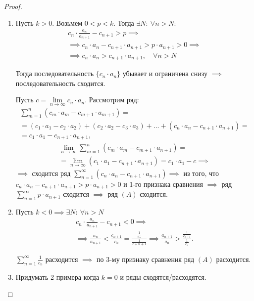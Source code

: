 \begin{proof}\leavevmode
    \begin{enumerate}
        \item Пусть $k > 0$. Возьмем $0 < p < k$. Тогда $\exists N : \ \forall n > N$:
              \begin{multline*}
                  c_n \cdot \frac{a_n}{a_{n+1}} - c_{n+1}>p \implies \\
                  \implies c_n \cdot a_n - c_{n+1} \cdot a_{n+1} > p \cdot a_{n+1} > 0 \implies \\
                  \implies c_n \cdot a_n > c_{n+1} \cdot a_{n+1}, \quad \forall n > N
              \end{multline*}

              Тогда последовательность $\{c_n\cdot a_n\}$ убывает и ограничена снизу $\implies$ последовательность сходится.

              Пусть $c=\underset{n\rightarrow\infty}{\lim}c_n\cdot a_n$. Рассмотрим ряд:
              \begin{multline*}
                  \sum_{m=1}^{n}(c_m\cdot a_m - c_{m+1}\cdot a_{m+1}) = \\
                  = (c_1 \cdot a_1 - c_2 \cdot a_2) + (c_2 \cdot a_2 - c_3 \cdot a_3) + \ldots + (c_n \cdot a_n - c_{n+1}\cdot a_{n+1}) = \\
                  = c_1 \cdot a_1 - c_{n+1} \cdot a_{n+1},
              \end{multline*}
              \begin{multline*}
                  \underset{n\rightarrow\infty}{\lim}\sum_{m=1}^{n}(c_m \cdot a_m - c_{m+1} \cdot a_{n+1}) = \\
                  = \underset{n\rightarrow\infty}{\lim}(c_1 \cdot a_1 - c_{n+1} \cdot a_{n+1}) = c_1 \cdot a_1 - c \implies
              \end{multline*}
              $\implies$ сходится ряд $\sum_{n=1}^{\infty}(c_n \cdot a_n - c_{n+1} \cdot a_{n+1}) \implies$ из того, что $c_n \cdot a_n - c_{n+1} \cdot a_{n+1} > p \cdot a_{n+1} > 0$ и 1-го признака сравнения $\implies$ ряд $\sum_{n=1}^{\infty}p\cdot a_{n+1}$ сходится $\implies$ ряд $(A)$ сходится.

        \item Пусть $k < 0 \implies \exists N: \ \forall n > N$
              \begin{multline*}
                  c_n \cdot \frac{a_n}{a_{n+1}} - c_{n+1} < 0 \implies \\
                  \implies \frac{a_n}{a_{n+1}} < \frac{c_{n+1}}{c_n} = \frac{\frac{1}{c_n}}{\frac{1}{c+{n+1}}} \implies \frac{a_{n+1}}{a_{n}} > \frac{\frac{1}{c_{n+1}}}{\frac{1}{c_n}}.
              \end{multline*}

              $\sum_{n=1}^{\infty}\frac{1}{c_n}$ расходится $\implies$ по 3-му признаку сравнения ряд $(A)$ расходится.

        \item Придумать 2 примера когда $k=0$ и ряды сходятся/расходятся.
    \end{enumerate}
\end{proof}


